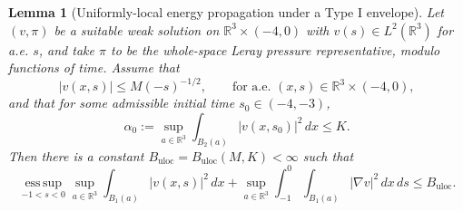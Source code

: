 \documentclass[11pt]{amsart}
\theoremstyle{plain}
\newtheorem{lemma}[lemma]{Lemma}
\theoremstyle{definition}
\theoremstyle{remark}
\begin{document}
\begin{lemma}[Uniformly-local energy propagation under a Type I envelope]
\label{lem:uloc-typeI-propagation}
Let \((v,\pi)\) be a suitable weak solution on
\(\mathbb R^3\times(-4,0)\) with \(v(s)\in L^2(\mathbb R^3)\) for a.e.
\(s\), and take \(\pi\) to be the whole-space Leray pressure representative,
modulo functions of time.  Assume that
\begin{equation}\label{eq:unit-typeI-envelope}
  |v(x,s)|\le M(-s)^{-1/2},
  \qquad \text{for a.e. }(x,s)\in\mathbb R^3\times(-4,0),
\end{equation}
and that for some admissible initial time \(s_0\in(-4,-3)\),
\begin{equation}\label{eq:unit-uloc-initial}
  \alpha_0
  :=\sup_{a\in\mathbb R^3}\int_{B_2(a)} |v(x,s_0)|^2\,dx
  \le K .
\end{equation}
Then there is a constant \(B_{\mathrm{uloc}}=B_{\mathrm{uloc}}(M,K)<\infty\)
such that
\begin{equation}\label{eq:unit-uloc-bound}
  \operatorname*{ess\,sup}_{-1<s<0}\sup_{a\in\mathbb R^3}
  \int_{B_1(a)} |v(x,s)|^2\,dx
  +
  \sup_{a\in\mathbb R^3}\int_{-1}^{0}\int_{B_1(a)}
  |\nabla v|^2\,dx\,ds
  \le B_{\mathrm{uloc}} .
\end{equation}
\end{lemma}
\end{document}
